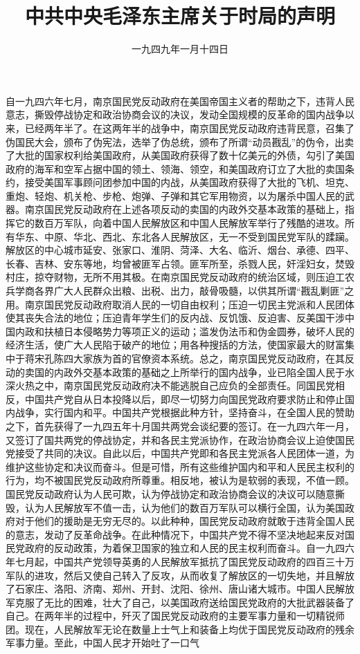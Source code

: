 
\title{中共中央毛泽东主席关于时局的声明}
\date{一九四九年一月十四日}
\maketitle


自一九四六年七月，南京国民党反动政府在美国帝国主义者的帮助之下，违背人民意志，撕毁停战协定和政治协商会议的决议，发动全国规模的反革命的国内战争以来，已经两年半了。在这两年半的战争中，南京国民党反动政府违背民意，召集了伪国民大会，颁布了伪宪法，选举了伪总统，颁布了所谓“动员戡乱”的伪令，出卖了大批的国家权利给美国政府，从美国政府获得了数十亿美元的外债，勾引了美国政府的海军和空军占据中国的领土、领海、领空，和美国政府订立了大批的卖国条约，接受美国军事顾问团参加中国的内战，从美国政府获得了大批的飞机、坦克、重炮、轻炮、机关枪、步枪、炮弹、子弹和其它军用物资，以为屠杀中国人民的武器。南京国民党反动政府在上述各项反动的卖国的内政外交基本政策的基础上，指挥它的数百万军队，向着中国人民解放区和中国人民解放军举行了残酷的进攻。所有华东、中原、华北、西北、东北各人民解放区，无一不受到国民党军队的蹂躏。解放区的中心城市延安、张家口、淮阴、菏泽、大名、临沂、烟台、承德、四平、长春、吉林、安东等地，均曾被匪军占领。匪军所至，杀戮人民，奸淫妇女，焚毁村庄，掠夺财物，无所不用其极。在南京国民党反动政府的统治区域，则压迫工农兵学商各界广大人民群众出粮、出税、出力，敲骨吸髓，以供其所谓“戡乱剿匪”之用。南京国民党反动政府取消人民的一切自由权利；压迫一切民主党派和人民团体使其丧失合法的地位；压迫青年学生们的反内战、反饥饿、反迫害、反美国干涉中国内政和扶植日本侵略势力等项正义的运动；滥发伪法币和伪金圆券，破坏人民的经济生活，使广大人民陷于破产的地位；用各种搜括的方法，使国家最大的财富集中于蒋宋孔陈四大家族为首的官僚资本系统。总之，南京国民党反动政府，在其反动的卖国的内政外交基本政策的基础之上所举行的国内战争，业已陷全国人民于水深火热之中，南京国民党反动政府决不能逃脱自己应负的全部责任。同国民党相反，中国共产党自从日本投降以后，即尽一切努力向国民党政府要求防止和停止国内战争，实行国内和平。中国共产党根据此种方针，坚持奋斗，在全国人民的赞助之下，首先获得了一九四五年十月国共两党会谈纪要的签订。在一九四六年一月，又签订了国共两党的停战协定，并和各民主党派协作，在政治协商会议上迫使国民党接受了共同的决议。自此以后，中国共产党即和各民主党派各人民团体一道，为维护这些协定和决议而奋斗。但是可惜，所有这些维护国内和平和人民民主权利的行为，均不被国民党反动政府所尊重。相反地，被认为是软弱的表现，不值一顾。国民党反动政府认为人民可欺，认为停战协定和政治协商会议的决议可以随意撕毁，认为人民解放军不值一击，认为他们的数百万军队可以横行全国，认为美国政府对于他们的援助是无穷无尽的。以此种种，国民党反动政府就敢于违背全国人民的意志，发动了反革命战争。在此种情况下，中国共产党不得不坚决地起来反对国民党政府的反动政策，为着保卫国家的独立和人民的民主权利而奋斗。自一九四六年七月起，中国共产党领导英勇的人民解放军抵抗了国民党反动政府的四百三十万军队的进攻，然后又使自己转入了反攻，从而收复了解放区的一切失地，并且解放了石家庄、洛阳、济南、郑州、开封、沈阳、徐州、唐山诸大城市。中国人民解放军克服了无比的困难，壮大了自己，以美国政府送给国民党政府的大批武器装备了自己。在两年半的过程中，歼灭了国民党反动政府的主要军事力量和一切精锐师团。现在，人民解放军无论在数量上士气上和装备上均优于国民党反动政府的残余军事力量。至此，中国人民才开始吐了一口气